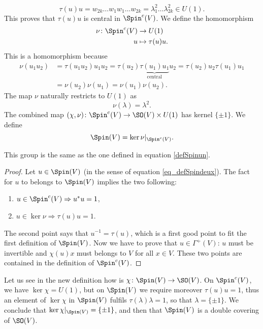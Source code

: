 \[ 
  \tau(u)u=w_{2k}\ldots w_{1}w_{1}\ldots w_{2k}
		=\lambda_{1}^{2}\ldots \lambda_{2k}^{2}\in U(1).
\]
This proves that $\tau(u)u$ is central in $\Spin^{c}(V)$. We define the homomorphism
\begin{equation}
\begin{aligned}
\nu \colon \Spin^{c}(V)&\to U(1) \\ 
u&\mapsto \tau(u)u. 
\end{aligned}
\end{equation}
This is a homomorphism because
\[ 
\begin{split}
  \nu(u_{1}u_{2})&=\tau(u_{1}u_{2})u_{1}u_{2}
		=\tau(u_{2})\underbrace{\tau(u_{1})u_{1}}_{\text{central}}u_{2}
		=\tau(u_{2})u_{2}\tau(u_{1})u_{1}\\
		&=\nu(u_{2})\nu(u_{1})
		=\nu(u_{1})\nu(u_{2}).
\end{split}  
\]
The map $\nu$ naturally restricts to $U(1)$ as
\[ 
  \nu(\lambda)=\lambda^{2}.
\]
The combined map $(\chi,\nu)\colon \Spin^{c}(V)\to \SO(V)\times U(1)$ has kernel $\{ \pm 1 \}$. We define
\begin{equation}  \label{eq_defSpindeux}
\Spin(V)=\ker\nu|_{\Spin^{c}(V)}.
\end{equation}

\begin{lemma}
This group is the same as the one defined in equation \eqref{defSpinun}. 
\end{lemma}

\begin{proof}
Let $u\in\Spin(V)$ (in the sense of equation \eqref{eq_defSpindeux}). The fact for $u$ to belongs to $\Spin(V)$ implies the two following:
\begin{enumerate}
\item $u\in\Spin^{c}(V)\Rightarrow u^*u=1$,
\item $u\in\ker\nu\Rightarrow \tau(u)u=1$.
\end{enumerate}
The second point says that $u^{-1}=\tau(u)$, which is a first good point to fit the first definition of $\Spin(V)$. Now we have to prove that $u\in\Gamma^{+}(V)$: $u$ must be invertible and $\chi(u)x$ must belongs to $V$ for all $x\in V$. These two points are contained in the definition of $\Spin^{c}(V)$.
\end{proof}
Let us see in the new definition how is $\chi\colon \Spin(V)\to \SO(V)$. On $\Spin^{c}(V)$, we have $\ker\chi=U(1)$, but on $\Spin(V)$ we require moreover $\tau(u)u=1$, thus an element of $\ker\chi$ in $\Spin(V)$ fulfils $\tau(\lambda)\lambda=1$, so that $\lambda=\{ \pm1 \}$. We conclude that $\ker\chi|_{\Spin(V)}=\{ \pm 1 \}$, and then that $\Spin(V)$ is a double covering of $\SO(V)$.


